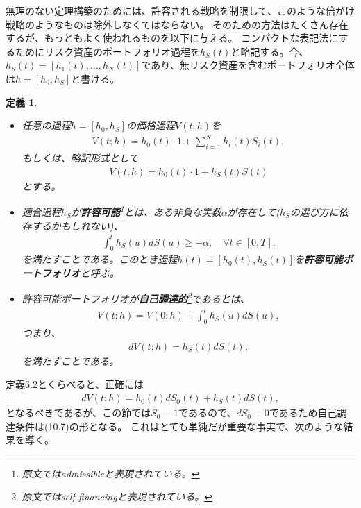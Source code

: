 \documentclass{jsbook}
\theoremstyle{withoutdotendstyle}
\newtheorem{definition}[theorem]{定義}
\numberwithin{theorem}{chapter}%
\begin{document}
無理のない定理構築のためには、許容される戦略を制限して、このような倍がけ戦略のようなものは除外しなくてはならない。
そのための方法はたくさん存在するが、もっともよく使われるものを以下に与える。
コンパクトな表記法にするためにリスク資産のポートフォリオ過程を$h_{S}\left(t\right)$と略記する。今、$h_{S}\left(t\right)=\left[h_{1}\left(t\right),\dots,h_{N}\left(t\right)\right]$であり、無リスク資産を含むポートフォリオ全体は$h=\left[h_{0}, h_{S}\right]$と書ける。

\begin{definition}
  \mbox{}
  \begin{itemize}
    \item 任意の過程$h=\left[h_{0}, h_{S}\right]$の価格過程$V\left(t;h\right)$を
    \begin{align}
      V\left(t;h\right)=h_{0}\left(t\right)\cdot 1+\sum_{i=1}^{N}h_{i}\left(t\right)S_{i}\left(t\right),
    \end{align}
    もしくは、略記形式として
    \begin{align}
      V\left(t;h\right) = h_{0}\left(t\right) \cdot 1 + h_{S}\left(t\right)S\left(t\right)
    \end{align}
    とする。
    \item 適合過程$h_{S}$が{\bf 許容可能}\footnote{原文ではadmissibleと表現されている。}とは、ある非負な実数$\alpha$が存在して($h_{S}$の選び方に依存するかもしれない)、
    \begin{align}
      \int_{0}^{t}h_{S}\left(u\right)dS\left(u\right)\geq-\alpha, \quad\forall t\in\left[0, T\right].
    \end{align}
    を満たすことである。このとき過程$h\left(t\right)=\left[h_{0}\left(t\right),h_{S}\left(t\right)\right]$を{\bf 許容可能ポートフォリオ}と呼ぶ。
    \item 許容可能ポートフォリオが{\bf 自己調達的}\footnote{原文ではself-financingと表現されている。}であるとは、
    \begin{align}
      V\left(t;h\right)=V\left(0;h\right)+\int_{0}^{t}h_{S}\left(u\right)dS\left(u\right),
    \end{align}
    つまり、
    \begin{align}
      dV\left(t;h\right)=h_{S}\left(t\right)dS\left(t\right),
    \end{align}
    を満たすことである。
  \end{itemize}
\end{definition}
定義6.2とくらべると、正確には
\begin{align*}
  dV\left(t;h\right)=h_{0}\left(t\right)dS_{0}\left(t\right) + h_{S}\left(t\right)dS\left(t\right),
\end{align*}
となるべきであるが、この節では$S_{0}\equiv 1$であるので、$dS_{0}\equiv 0$であるため自己調達条件は(10.7)の形となる。
これはとても単純だが重要な事実で、次のような結果を導く。
\end{document}

